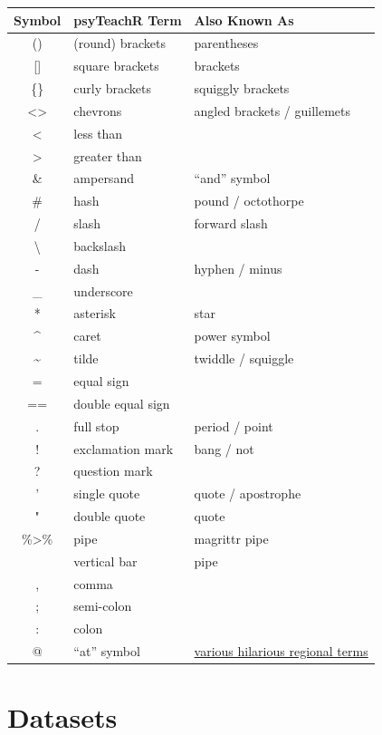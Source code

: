 \documentclass[
  oneside]{book}
\begin{document}
\begin{longtable}[]{@{}cll@{}}
\toprule
Symbol & psyTeachR Term & Also Known As \\
\midrule
\endhead
() & (round) brackets & parentheses \\
{[}{]} & square brackets & brackets \\
\{\} & curly brackets & squiggly brackets \\
\textless\textgreater{} & chevrons & angled brackets / guillemets \\
\textless{} & less than & \\
\textgreater{} & greater than & \\
\& & ampersand & ``and'' symbol \\
\# & hash & pound / octothorpe \\
/ & slash & forward slash \\
\textbackslash{} & backslash & \\
- & dash & hyphen / minus \\
\_ & underscore & \\
* & asterisk & star \\
\^{} & caret & power symbol \\
\textasciitilde{} & tilde & twiddle / squiggle \\
= & equal sign & \\
== & double equal sign & \\
. & full stop & period / point \\
! & exclamation mark & bang / not \\
? & question mark & \\
' & single quote & quote / apostrophe \\
" & double quote & quote \\
\%\textgreater\% & pipe & magrittr pipe \\
\textbar{} & vertical bar & pipe \\
, & comma & \\
; & semi-colon & \\
: & colon & \\
@ & ``at'' symbol & \href{https://www.theguardian.com/notesandqueries/query/0,5753,-1773,00.html}{various hilarious regional terms} \\
\bottomrule
\end{longtable}

\hypertarget{datasets}{%
\chapter{Datasets}\label{datasets}}
\end{document}
